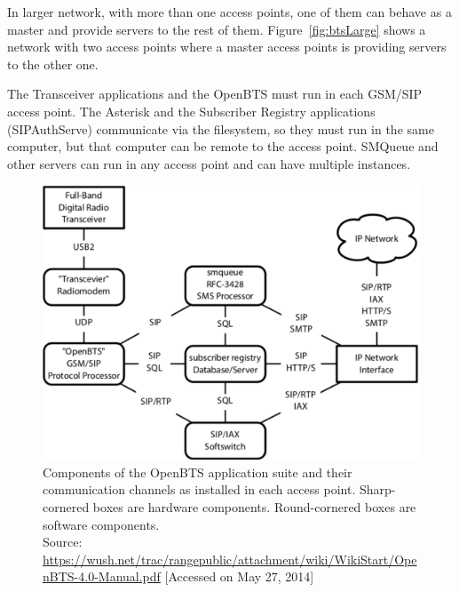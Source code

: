 In larger network, with more than one access points, one of them can behave as a master and provide servers to the rest of them.
Figure~\ref{fig:btsLarge} shows a network with two access points where
a master access points is providing servers to the other one.

The Transceiver applications and the OpenBTS must run in each GSM/SIP access point. 
The Asterisk and the Subscriber Registry applications (SIPAuthServe) 
communicate via the filesystem, so they must run in the same computer,
but that computer can be remote to the access point. 
SMQueue and other servers can run in any access point and can have 
multiple instances.
\begin{figure}
  \centering
    \includegraphics[width=\textwidth]{btsSimple}
  \caption[Simplest OpenBTS network]{Components of the OpenBTS application suite 
  and their communication channels as installed in each
access point. Sharp-cornered boxes are hardware components.
Round-cornered boxes are software components.\\
\footnotesize{Source: \url{https://wush.net/trac/rangepublic/attachment/wiki/WikiStart/OpenBTS-4.0-Manual.pdf} [Accessed on May 27, 2014]}}
  \label{fig:btsSimple}
\end{figure}

